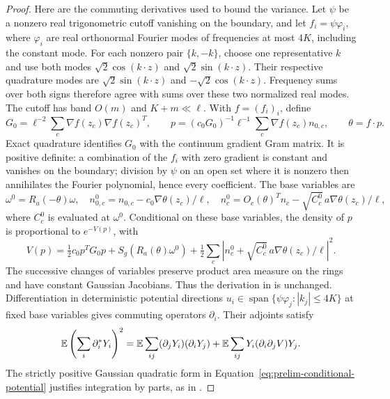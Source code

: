 \begin{proof}
Here are the commuting derivatives used to bound the variance. Let
$\psi$ be a nonzero real trigonometric cutoff vanishing on the boundary, and
let $f_i=\psi\varphi_i$, where $\varphi_i$ are real orthonormal Fourier
modes of frequencies at most $4K$, including the constant mode.
For each nonzero pair $\{k,-k\}$, choose one representative $k$ and use
both modes $\sqrt2\cos(k\cdot z)$ and $\sqrt2\sin(k\cdot z)$.
Their respective quadrature modes are
$\sqrt2\sin(k\cdot z)$ and $-\sqrt2\cos(k\cdot z)$.
Frequency sums over both signs therefore agree with sums over these
two normalized real modes. The cutoff has band $O(m)$ and
$K+m\ll\ell$. With $f=(f_i)_i$, define
\[
 G_0=\ell^{-2}\sum_c\nabla f(z_c)\nabla f(z_c)^T,
 \qquad
 p=(c_0G_0)^{-1}\ell^{-1}\sum_c\nabla f(z_c)n_{0,c},
 \qquad \theta=f\cdot p.
\]
Exact quadrature identifies $G_0$ with the continuum gradient Gram
matrix. It is positive definite: a combination of the $f_i$ with zero
gradient is constant and vanishes on the boundary; division by $\psi$
on an open set where it is nonzero then annihilates the Fourier
polynomial, hence every coefficient. The base variables are
\[
 \omega^0=R_a(-\theta)\omega,\quad
 n_{0,c}^0=n_{0,c}-c_0\nabla\theta(z_c)/\ell,\quad
 n_c^0=O_c(\theta)^Tn_c-\sqrt{C_c^0}\,a\nabla\theta(z_c)/\ell,
\]
where $C_c^0$ is evaluated at $\omega^0$. Conditional on these base
variables, the density of $p$ is proportional to $e^{-V(p)}$, with
\begin{equation}
 V(p)=\tfrac12c_0p^TG_0p+S_g(R_a(\theta)\omega^0)
 +\tfrac12\sum_c|n_c^0+\sqrt{C_c^0}\,a\nabla\theta(z_c)/\ell|^2.
 \label{eq:prelim-conditional-potential}
\end{equation}
The successive changes of variables preserve product area measure on
the rings and have constant Gaussian Jacobians. Thus the derivation in
 is unchanged. Differentiation in deterministic
potential directions
$u_i\in\operatorname{span}\{\psi\varphi_j:|k_j|\le4K\}$ at fixed base
variables gives commuting operators $\partial_i$. Their adjoints satisfy
\begin{equation}
 \mathbb E\left(\sum_i\partial_i^*Y_i\right)^2
 =\mathbb E\sum_{ij}(\partial_jY_i)(\partial_iY_j)
  +\mathbb E\sum_{ij}Y_i(\partial_i\partial_jV)Y_j.
 \label{eq:prelim-ibp-array}
\end{equation}
The strictly positive Gaussian quadratic form in
Equation~\eqref{eq:prelim-conditional-potential} justifies integration
by parts, as in .


\end{proof}

